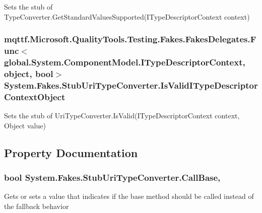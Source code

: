 Sets the stub of Type\-Converter.\-Get\-Standard\-Values\-Supported(\-I\-Type\-Descriptor\-Context context)

\hypertarget{class_system_1_1_fakes_1_1_stub_uri_type_converter_a0bc22e2b38e0107789c9043262edb68e}{
\subsubsection[{Is\-Valid\-I\-Type\-Descriptor\-Context\-Object}]{\setlength{\rightskip}{0pt plus 5cm}mqttf.\-Microsoft.\-Quality\-Tools.\-Testing.\-Fakes.\-Fakes\-Delegates.\-Func$<$global.\-System.\-Component\-Model.\-I\-Type\-Descriptor\-Context, object, bool$>$ System.\-Fakes.\-Stub\-Uri\-Type\-Converter.\-Is\-Valid\-I\-Type\-Descriptor\-Context\-Object}}\label{class_system_1_1_fakes_1_1_stub_uri_type_converter_a0bc22e2b38e0107789c9043262edb68e}


Sets the stub of Uri\-Type\-Converter.\-Is\-Valid(\-I\-Type\-Descriptor\-Context context, Object value)



\subsection{Property Documentation}
\hypertarget{class_system_1_1_fakes_1_1_stub_uri_type_converter_a4157a26fd166f310a50135b696679d5a}{
\subsubsection[{Call\-Base}]{\setlength{\rightskip}{0pt plus 5cm}bool System.\-Fakes.\-Stub\-Uri\-Type\-Converter.\-Call\-Base\hspace{0.3cm}{\ttfamily [get]}, {\ttfamily [set]}}}\label{class_system_1_1_fakes_1_1_stub_uri_type_converter_a4157a26fd166f310a50135b696679d5a}


Gets or sets a value that indicates if the base method should be called instead of the fallback behavior

